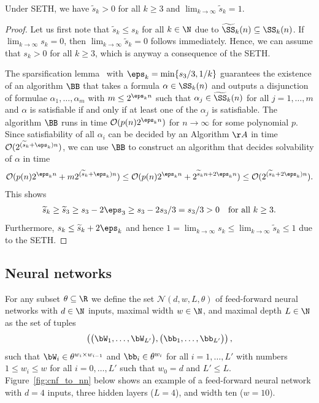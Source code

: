 \documentclass{amsart}[11pt]
\numberwithin{equation}{section}
\newcommand{\nn}{\mathcal{N}}
\newcommand{\order}{\mathcal{O}}
\numberwithin{theorem}{section}
\begin{document}
\begin{lemma}\label{lem:sparsification}
    Under SETH, we have $\widetilde s_k>0$ for all $k\geq 3$ and $\lim_{k \to \infty} \widetilde s_k=1$.
\end{lemma}
\begin{proof}
   Let us first note that $\widetilde s_k \leq s_k$ for all $k \in \N$ due to $\widetilde \SS_k(n)\subseteq \SS_k(n)$. If $\lim_{k\to \infty} s_k=0$, then $\lim_{k\to \infty} \widetilde s_k=0$ follows immediately. Hence, we can assume that $s_k > 0$ for all $k \geq 3$, which is anyway a consequence of the SETH.
    
   The sparsification lemma~\cite[Theorem~1]{IMPAGLIAZZO2001512} with $\eps_k=\min\{s_3/3,1/k\}$ guarantees the existence of an algorithm $\BB$ that takes a formula $\alpha\in \SS_k(n)$ and
    outputs a disjunction of formulae $\alpha_1, \ldots, \alpha_m$ with $m \leq 2^{\eps_k n}$ such that $\alpha_j\in\widetilde \SS_k(n)$ for all $j = 1, \ldots, m$ and $\alpha$ is satisfiable if and only if at least one of the $\alpha_j$ is satisfiable. The algorithm $\BB$ runs in time $\order(p(n)2^{\eps_k n})$ for $n \to \infty$ for some polynomial $p$. Since satisfiability of all $\alpha_i$ can be decided by an Algorithm $\AA$ in time $\order(2^{(\widetilde s_k + \eps_k) n})$, we can use $\BB$ to construct an algorithm that decides solvability of $\alpha$ in time
    \begin{align*}
    \order(p(n)2^{\eps_k n} + m  2^{(\widetilde s_k + \eps_k) n}) \leq \order(p(n)2^{\eps_k n} + 2^{\widetilde s_k n + 2\eps_k n}) \leq  \order(2^{(\widetilde s_k + 2\eps_k)n}).
    \end{align*}
    This shows
    \begin{align*}
        \widetilde s_k \geq \widetilde s_3 \geq s_3 - 2\eps_3 \geq s_3 - 2 s_3/3 = s_3/3 > 0 \quad \text{for all } k \geq 3.
    \end{align*}
    Furthermore, $s_k\leq \widetilde s_k + 2\eps_k$ and hence $1 = \lim_{k \to \infty} s_k \leq \lim_{k \to \infty} \widetilde s_k \leq 1$ due to the SETH.
\end{proof}

\subsection{Neural networks}
For any subset $\theta \subseteq \R$ we define the set $\nn(d,w,L,\theta)$ of feed-forward neural networks with $d\in\N$ inputs, maximal width $w\in\N$, and maximal depth $L\in\N$ as the set of tuples
\begin{align*}
    \left(\big(\bW_1,\ldots,\bW_{L'}\big),\big(\bb_1,\ldots,\bb_{L'}\big)\right),
\end{align*}
such that $\bW_i\in \theta^{w_{i}\times w_{i-1}}$ and $\bb_i\in \theta^{w_{i}}$ for all $i=1,\ldots,L'$ with numbers $1\leq w_i\leq w$ for all $i=0,\ldots,L'$  such that $w_0 = d$ and $L'\leq L$. Figure~\ref{fig:cnf_to_nn} below shows an example of a feed-forward neural network with $d=4$ inputs, three hidden layers ($L = 4$), and width ten ($w = 10$).
\end{document}
